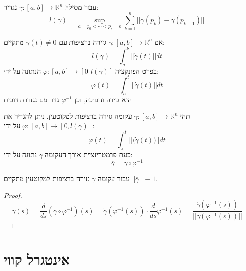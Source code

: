 \documentclass{tstextbook}
\begin{document}
\begin{definition}
עבור מסילה \(\gamma:[a,b]\to \mathbb{R}^{n}\) נגדיר:
$$l(\gamma)=\operatorname*{sup}_{a=p_{0}<\cdots<p_{n}=b}\sum_{k=1}^{n}||\gamma(p_{k})-\gamma(p_{k-1})||$$

\end{definition}
\begin{proposition}
אם \(\gamma:[a,b]\to \mathbb{R}^{n}\) גזירה ברציפות עם \(\dot{\gamma}(t)\neq 0\) מתקיים:
$$l(\gamma)=\int_{a}^{b}||{\dot{\gamma}}(t)||d t$$
בפרט הפונקציה \(\varphi:[a,b]\rightarrow[0,l(\gamma)]\) הנתונה על ידי:
$$\varphi(t)=\int_{a}^{t}||{\dot{\gamma}}(t)||d t$$
היא גזירה והפיכה, וכן \(\varphi ^{-1}\) גזיר עם נגזרת חיובית

\end{proposition}
\begin{definition}
תהי \(\gamma:[a,b]\to\mathbb{R}^{n}\) עקומה גזירה ברציפות למקוטעין. ניתן להגדיר את \(\varphi:[a,b]\rightarrow[0,l(\gamma)]\) על ידי:
$$\varphi(t)=\int_{a}^{t}||{{\bigl(}}\dot{\gamma}(t){\bigr)}||d t$$
כעת פרמטריזציית אורך העקומה \(\overline{\gamma}\) נתונה על ידי:
$$\overline{{{\gamma}}}=\gamma\circ\varphi^{-1}$$

\end{definition}
\begin{proposition}
עבור עקומה \(\gamma\) גזירה ברציפות למקוטעין מתקיים \(||\dot{\overline{{{\gamma}}}}||\equiv1\).

\end{proposition}
\begin{proof}
$$\dot{\bar{\gamma}}(s)=\frac{d}{d s}(\gamma\circ\varphi^{-1})(s)=\dot{\gamma}(\varphi^{-1}(s))\cdot\frac{d}{d s}\varphi^{-1}(s)=\frac{\dot{\gamma}(\varphi^{-1}(s))}{||\dot{\gamma}(\varphi^{-1}(s))||}$$

\end{proof}
\section{אינטגרל קווי}
\end{document}

